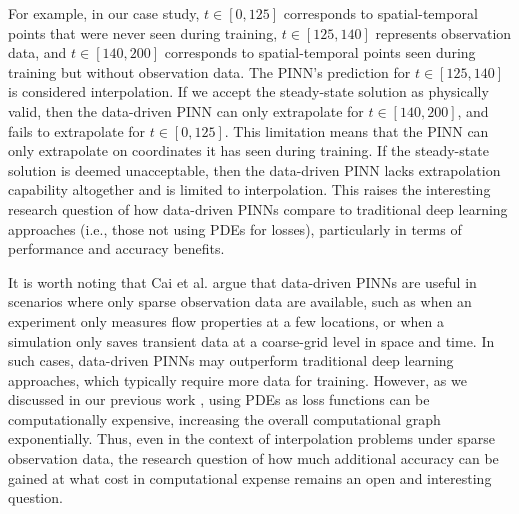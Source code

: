 For example, in our case study, $t \in [0, 125]$ corresponds to spatial-temporal points that were never seen during training, $t \in [125, 140]$ represents observation data, and $t \in [140, 200]$ corresponds to spatial-temporal points seen during training but without observation data.
The PINN's prediction for $t \in [125, 140]$ is considered interpolation.
If we accept the steady-state solution as physically valid, then the data-driven PINN can only extrapolate for $t \in [140, 200]$, and fails to extrapolate for $t \in [0, 125]$.
This limitation means that the PINN can only extrapolate on coordinates it has seen during training.
If the steady-state solution is deemed unacceptable, then the data-driven PINN lacks extrapolation capability altogether and is limited to interpolation.
This raises the interesting research question of how data-driven PINNs compare to traditional deep learning approaches (i.e., those not using PDEs for losses), particularly in terms of performance and accuracy benefits.

It is worth noting that Cai et al. \cite{cai_physics-informed_2021} argue that data-driven PINNs are useful in scenarios where only sparse observation data are available, such as when an experiment only measures flow properties at a few locations, or when a simulation only saves transient data at a coarse-grid level in space and time.
In such cases, data-driven PINNs may outperform traditional deep learning approaches, which typically require more data for training.
However, as we discussed in our previous work \cite{chuang_experience_2022}, using PDEs as loss functions can be computationally expensive, increasing the overall computational graph exponentially.
Thus, even in the context of interpolation problems under sparse observation data, the research question of how much additional accuracy can be gained at what cost in computational expense remains an open and interesting question.

